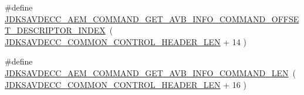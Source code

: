 \begin{DoxyCompactItemize}
\#define \hyperlink{group__command__get__avb__info_ga0476a8846acaacdae1192f13cfe1baae}{J\+D\+K\+S\+A\+V\+D\+E\+C\+C\+\_\+\+A\+E\+M\+\_\+\+C\+O\+M\+M\+A\+N\+D\+\_\+\+G\+E\+T\+\_\+\+A\+V\+B\+\_\+\+I\+N\+F\+O\+\_\+\+C\+O\+M\+M\+A\+N\+D\+\_\+\+O\+F\+F\+S\+E\+T\+\_\+\+D\+E\+S\+C\+R\+I\+P\+T\+O\+R\+\_\+\+I\+N\+D\+EX}~( \hyperlink{group__jdksavdecc__avtp__common__control__header_gaae84052886fb1bb42f3bc5f85b741dff}{J\+D\+K\+S\+A\+V\+D\+E\+C\+C\+\_\+\+C\+O\+M\+M\+O\+N\+\_\+\+C\+O\+N\+T\+R\+O\+L\+\_\+\+H\+E\+A\+D\+E\+R\+\_\+\+L\+EN} + 14 )
\item 
\#define \hyperlink{group__command__get__avb__info_ga03ff73929ab6bb81117193c267872fec}{J\+D\+K\+S\+A\+V\+D\+E\+C\+C\+\_\+\+A\+E\+M\+\_\+\+C\+O\+M\+M\+A\+N\+D\+\_\+\+G\+E\+T\+\_\+\+A\+V\+B\+\_\+\+I\+N\+F\+O\+\_\+\+C\+O\+M\+M\+A\+N\+D\+\_\+\+L\+EN}~( \hyperlink{group__jdksavdecc__avtp__common__control__header_gaae84052886fb1bb42f3bc5f85b741dff}{J\+D\+K\+S\+A\+V\+D\+E\+C\+C\+\_\+\+C\+O\+M\+M\+O\+N\+\_\+\+C\+O\+N\+T\+R\+O\+L\+\_\+\+H\+E\+A\+D\+E\+R\+\_\+\+L\+EN} + 16 )
\end{DoxyCompactItemize}

